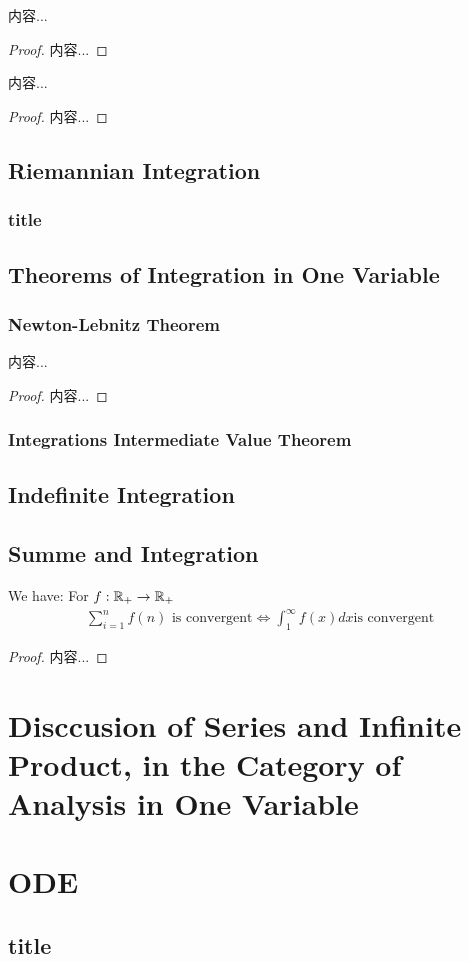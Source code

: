 \documentclass[Total.tex]{subfiles}
\begin{document}
			\begin{proposition}
				内容...
			\end{proposition}
			\begin{proof}
				内容...
			\end{proof}
			
			\begin{corollary}
				内容...
			\end{corollary}
			\begin{proof}
				内容...
			\end{proof}
		\section{Riemannian Integration}
			\subsection{title}
		\section{Theorems of Integration in One Variable}
			\subsection{Newton-Lebnitz Theorem}
				\begin{theorem}
					内容...
				\end{theorem}
				\begin{proof}
					内容...
				\end{proof}
			\subsection{Integrations Intermediate Value Theorem}
		\section{Indefinite Integration}
		\section{Summe and Integration}
			\begin{lemma}
				We have: For $f:\mathbb{R}_+\rightarrow \mathbb{R}_+$ 
				\begin{gather*}
					\sum_{i=1}^n f(n)\mbox{ is convergent}\Leftrightarrow \int_1^\infty f(x)dx\mbox{is convergent}
				\end{gather*}
			\end{lemma}
			\begin{proof}
				内容...
			\end{proof}
			
			
	
	\chapter{Disccusion of Series and Infinite Product, in the Category of Analysis in One Variable}
	\chapter{ODE}
		\section{title}
\end{document}

